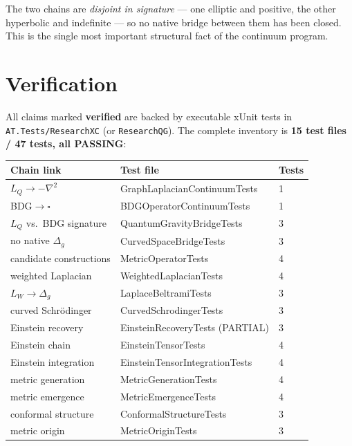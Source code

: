 \documentclass[10pt,a4paper]{article}
\begin{document}
The two chains are \emph{disjoint in signature} --- one elliptic and positive, the other
hyperbolic and indefinite --- so no native bridge between them has been closed. This is the
single most important structural fact of the continuum program.

\section{Verification}

All claims marked \textbf{verified} are backed by executable xUnit tests in
\texttt{AT.Tests/ResearchXC} (or \texttt{ResearchQG}). The complete inventory is
\textbf{15 test files / 47 tests, all PASSING}:

\begin{center}
\begin{tabular}{lll}
\toprule
Chain link & Test file & Tests \\
\midrule
$L_Q\to-\nabla^2$ & GraphLaplacianContinuumTests & 1 \\
BDG$\to\square$ & BDGOperatorContinuumTests & 1 \\
$L_Q$ vs.\ BDG signature & QuantumGravityBridgeTests & 3 \\
no native $\Delta_g$ & CurvedSpaceBridgeTests & 3 \\
candidate constructions & MetricOperatorTests & 4 \\
weighted Laplacian & WeightedLaplacianTests & 4 \\
$L_W\to\Delta_g$ & LaplaceBeltramiTests & 3 \\
curved Schr\"odinger & CurvedSchrodingerTests & 3 \\
Einstein recovery & EinsteinRecoveryTests (PARTIAL) & 3 \\
Einstein chain & EinsteinTensorTests & 4 \\
Einstein integration & EinsteinTensorIntegrationTests & 4 \\
metric generation & MetricGenerationTests & 4 \\
metric emergence & MetricEmergenceTests & 4 \\
conformal structure & ConformalStructureTests & 3 \\
metric origin & MetricOriginTests & 3 \\
\bottomrule
\end{tabular}
\end{center}
\end{document}
